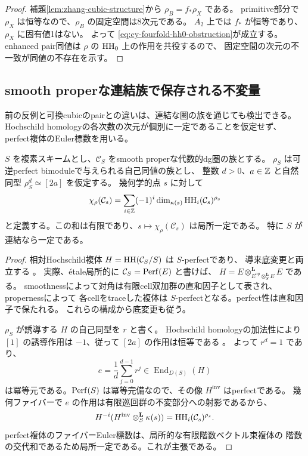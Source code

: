 \begin{proof}
 補題\ref{lem:zhang-cubic-structure}から \(\rho_B=f_*\rho_X\) である。
 primitive部分で \(\rho_X\) は恒等なので、\(\rho_B\) の固定空間は8次元である。
 \(A_2\) 上では \(f_*\) が恒等であり、\(\rho_X\) に固有値1はない。
 よって \eqref{eq:cy-fourfold-hh0-obstruction}が成立する。
 enhanced pair同値は \(\rho\) の \(\operatorname{HH}_0\) 上の作用を共役するので、
 固定空間の次元の不一致が同値の不存在を示す。
\end{proof}

\subsection{smooth properな連結族で保存される不変量}

前の反例と可換cubicのpairとの違いは、連結な圏の族を通じても検出できる。
Hochschild homologyの各次数の次元が個別に一定であることを仮定せず、
perfect複体のEuler標数を用いる。

\begin{proposition}[rotation不変Euler標数の局所一定性]
\label{prop:rotation-euler-locally-constant}
 \(S\) を複素スキームとし、\(\mathcal C_S\) をsmooth properな代数的dg圏の族とする。
 \(\rho_S\) は可逆perfect bimoduleで与えられる自己同値の族とし、
 整数 \(d>0\)、\(a\in\mathbb Z\) と自然同型 \(\rho_S^d\simeq[2a]\) を仮定する。
 幾何学的点 \(s\) に対して
 \[
 \chi_{\rho}(\mathcal C_s)
   =\sum_{i\in\mathbb Z}(-1)^i
        \dim_{\kappa(s)}\operatorname{HH}_i(\mathcal C_s)^{\rho_s}
 \]
 と定義する。この和は有限であり、\(s\mapsto\chi_{\rho}(\mathcal C_s)\) は局所一定である。
 特に \(S\) が連結なら一定である。
\end{proposition}
\begin{proof}
 相対Hochschild複体 \(H=\operatorname{HH}(\mathcal C_S/S)\) は \(S\)-perfectであり、
 導来底変更と両立する \cite[Lemmas 3.4, 3.6]{PerryIHC}。
 実際、étale局所的に \(\mathcal C_S=\operatorname{Perf}(E)\) と書けば、
 \(H=E\otimes^{\mathbf L}_{E^{\mathrm{op}}\otimes^{\mathbf L}_S E}E\) である。
 smoothnessによって対角は有限cell双加群の直和因子として表され、propernessによって
 各cellをtraceした複体は \(S\)-perfectとなる。perfect性は直和因子で保たれる。
 これらの構成から底変更も従う。

 \(\rho_S\) が誘導する \(H\) の自己同型を \(r\) と書く。
 Hochschild homologyの加法性により \([1]\) の誘導作用は \(-1\)、従って
 \([2a]\) の作用は恒等である \cite[Section 4, Example 5.6]{CisinskiTabuada}。
 よって \(r^d=1\) であり、
 \[
 e=\frac1d\sum_{j=0}^{d-1}r^j\in\operatorname{End}_{D(S)}(H)
 \]
 は冪等元である。\(\operatorname{Perf}(S)\) は冪等完備なので、その像 \(H^{\mathrm{inv}}\) はperfectである。
 幾何ファイバーで \(e\) の作用は有限巡回群の不変部分への射影であるから、
 \[
 H^{-i}(H^{\mathrm{inv}}\otimes_S^{\mathbf L}\kappa(s))
     =\operatorname{HH}_i(\mathcal C_s)^{\rho_s}.
 \]
 perfect複体のファイバーEuler標数は、局所的な有限階数ベクトル束複体の
 階数の交代和であるため局所一定である。これが主張である。
\end{proof}

